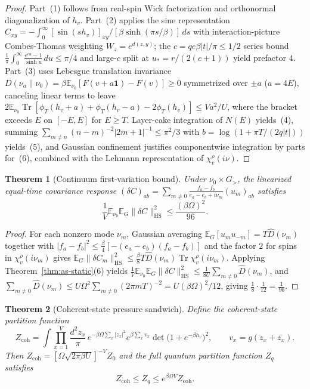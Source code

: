 \documentclass[11pt]{article}
\newtheorem{theorem}{Theorem}[section]
\theoremstyle{definition}
\theoremstyle{remark}
\DeclareMathOperator{\Tr}{Tr}
\newcommand{\E}{\mathbb{E}}
\begin{document}
\begin{proof}
Part~(1) follows from real-spin Wick factorization and orthonormal diagonalization
of $h_v$. Part~(2) applies the sine representation
$C_{xy} = -\int_0^\infty [\sin(s h_v)]_{xy}/[\beta\sinh(\pi s/\beta)]\,ds$
with interaction-picture Combes-Thomas weighting $W_z = e^{d(z,y)}$; the
$c = qe\beta|t|/\pi \le 1/2$ series bound $\frac{1}{\pi}\int_0^\infty \frac{e^{cu}-1}{\sinh u}\,du \le \pi/4$
and large-$c$ split at $u_* = r/(2(c+1))$ yield prefactor $4$. Part~(3) uses
Lebesgue translation invariance $D(\nu_a \| \nu_0) = \beta \E_{\nu_0}[F(v+a\mathbf{1}) - F(v)] \ge 0$
symmetrized over $\pm a$ ($a = 4E$), canceling linear terms to leave
$2\E_{\nu_0}\Tr[\phi_T(h_v+a) + \phi_T(h_v-a) - 2\phi_T(h_v)] \le V a^2/U$,
where the bracket exceeds $E$ on $[-E,E]$ for $E \ge T$. Layer-cake integration
of $N(E)$ yields~(4), summing $\sum_{m \ne n}(n-m)^{-2}|2m+1|^{-1} \le \pi^2/3$
with $b = \log(1 + \pi T/(2q|t|))$ yields~(5), and Gaussian confinement
justifies componentwise integration by parts for~(6), combined with the
Lehmann representation of $\chi_v^\rho(i\nu)$.
\end{proof}

\begin{theorem}[Continuum first-variation bound]
\label{thm:as-firstvar}
Under $\nu_0 \times G_>$, the linearized equal-time covariance response
$(\delta C)_{ab} = \sum_{m \ne 0} \frac{f_a - f_b}{e_a - e_b + i\nu_m} (u_m)_{ab}$
satisfies
\begin{equation}
\label{eq:as-1over96}
\frac{1}{V} \E_{\nu_0} \E_G \|\delta C\|_{\mathrm{HS}}^2
\le \frac{(\beta\Omega)^2}{96}.
\end{equation}
\end{theorem}

\begin{proof}
For each nonzero mode $\nu_m$, Gaussian averaging $\E_G[u_m u_{-m}] = T\hat{D}(\nu_m)$
together with $|f_a - f_b|^2 \le \frac{\beta}{4}[-(e_a-e_b)(f_a-f_b)]$ and
the factor $2$ for spins in $\chi_v^\rho(i\nu_m)$ gives
$\E_G \|\delta C_m\|_{\mathrm{HS}}^2 \le \frac{\beta}{8} T\hat{D}(\nu_m)\Tr\chi_v^\rho(i\nu_m)$.
Applying Theorem~\ref{thm:as-static}(6) yields
$\frac{1}{V}\E_{\nu_0}\E_G\|\delta C\|_{\mathrm{HS}}^2 \le \frac{1}{8U}\sum_{m\ne 0}\hat{D}(\nu_m)$,
and $\sum_{m\ne 0} \hat{D}(\nu_m) \le U\Omega^2 \sum_{m \ne 0}(2\pi m T)^{-2} = U(\beta\Omega)^2/12$,
giving $\frac{1}{8}\cdot \frac{1}{12} = \frac{1}{96}$.
\end{proof}

\begin{theorem}[Coherent-state pressure sandwich]
\label{thm:as-sandwich}
Define the coherent-state partition function
\[
Z_{\mathrm{coh}}
= \int \prod_{x=1}^V \frac{d^2 z_x}{\pi}\, e^{-\beta\Omega\sum_x |z_x|^2}
  e^{\beta\sum_x v_x} \det\bigl(1 + e^{-\beta h_v}\bigr)^2,
\qquad
v_x = g(z_x + \overline{z_x}).
\]
Then $Z_{\mathrm{coh}} = [\Omega\sqrt{2\pi\beta U}]^{-V} Z_0$ and the full
quantum partition function $Z_q$ satisfies
\begin{equation}
\label{eq:as-sandwich}
Z_{\mathrm{coh}} \le Z_q \le e^{\beta\Omega V} Z_{\mathrm{coh}}.
\end{equation}
\end{theorem}
\end{document}
